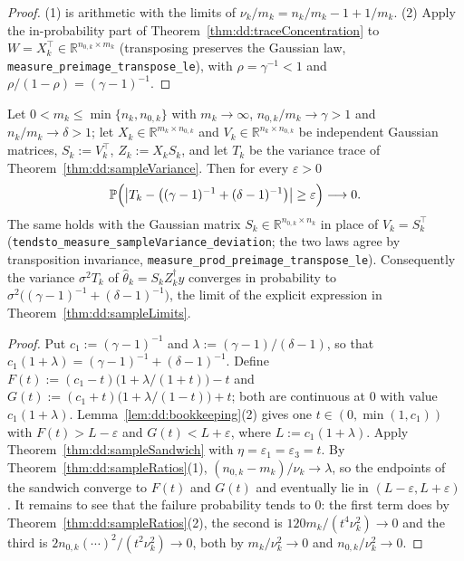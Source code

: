 \begin{proof}
  \leanok
(1) is arithmetic with the limits of $\nu_k/m_k=n_k/m_k-1+1/m_k$. (2) Apply the in-probability part of Theorem~\ref{thm:dd:traceConcentration} to $W=X_k^\top\in\mathbb R^{n_{0,k}\times m_k}$ (transposing preserves the Gaussian law, \texttt{measure\_preimage\_transpose\_le}), with $\rho=\gamma^{-1}<1$ and
$\rho/(1-\rho)=(\gamma-1)^{-1}$.
\end{proof}

\begin{theorem}\label{thm:dd:sampleVarianceProb}
  \leanok
Let $0<m_k\le\min\{n_k,n_{0,k}\}$ with $m_k\to\infty$, $n_{0,k}/m_k\to\gamma>1$ and $n_k/m_k\to\delta>1$; let $X_k\in\mathbb R^{m_k\times n_{0,k}}$ and $V_k\in\mathbb R^{n_k\times n_{0,k}}$ be independent Gaussian matrices, $S_k:=V_k^\top$, $Z_k:=X_kS_k$, and let $T_k$ be the variance trace of Theorem~\ref{thm:dd:sampleVariance}. Then for every $\varepsilon>0$
\[
  \mathbb P\Bigl(\bigl|T_k-\bigl((\gamma-1)^{-1}+(\delta-1)^{-1}\bigr)\bigr|\ge\varepsilon\Bigr)\longrightarrow0 .
\]
The same holds with the Gaussian matrix $S_k\in\mathbb R^{n_{0,k}\times n_k}$ in place of $V_k=S_k^\top$ (\texttt{tendsto\_measure\_sampleVariance\_deviation}; the two laws agree by transposition invariance, \texttt{measure\_prod\_preimage\_transpose\_le}). Consequently the variance $\sigma^2T_k$ of $\hat\theta_k=S_kZ_k^\dagger y$ converges in probability to $\sigma^2\bigl((\gamma-1)^{-1}+(\delta-1)^{-1}\bigr)$, the limit of the explicit expression in Theorem~\ref{thm:dd:sampleLimits}.
\end{theorem}

\begin{proof}
  \leanok
Put $c_1:=(\gamma-1)^{-1}$ and $\lambda:=(\gamma-1)/(\delta-1)$, so that $c_1(1+\lambda)=(\gamma-1)^{-1}+(\delta-1)^{-1}$. Define $F(t):=(c_1-t)\bigl(1+\lambda/(1+t)\bigr)-t$ and $G(t):=(c_1+t)\bigl(1+\lambda/(1-t)\bigr)+t$; both are continuous at $0$ with value $c_1(1+\lambda)$. Lemma~\ref{lem:dd:bookkeeping}(2) gives one $t\in(0,\min(1,c_1))$
with $F(t)>L-\varepsilon$ and $G(t)<L+\varepsilon$, where $L:=c_1(1+\lambda)$. Apply Theorem~\ref{thm:dd:sampleSandwich} with $\eta=\varepsilon_1=\varepsilon_3=t$. By Theorem~\ref{thm:dd:sampleRatios}(1), $(n_{0,k}-m_k)/\nu_k\to\lambda$, so the endpoints of the sandwich converge to $F(t)$ and $G(t)$ and
eventually lie in $(L-\varepsilon,L+\varepsilon)$. It remains to see that the failure probability tends to $0$: the first term does by Theorem~\ref{thm:dd:sampleRatios}(2), the second is $120m_k/(t^4\nu_k^2)\to0$ and the third is $2n_{0,k}(\cdots)^2/(t^2\nu_k^2)\to0$, both by $m_k/\nu_k^2\to0$ and $n_{0,k}/\nu_k^2\to0$.
\end{proof}

